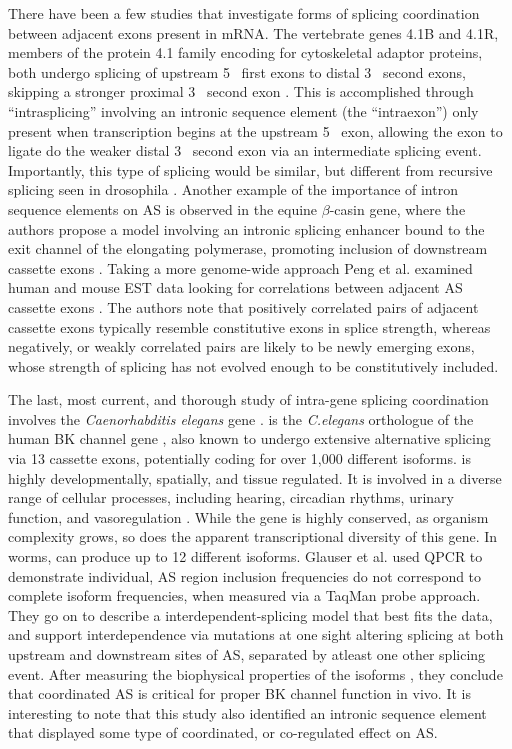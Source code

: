 There have been a few studies that investigate forms of splicing coordination between adjacent exons present in mRNA. The vertebrate genes 4.1B and 4.1R, members of the protein 4.1 family encoding for cytoskeletal adaptor proteins, both undergo splicing of upstream 5\textprime~ first exons to distal 3\textprime~ second exons, skipping a stronger proximal 3\textprime~ second exon \citep{Parra2008, Parra2012}. This is accomplished through ``intrasplicing'' involving an intronic sequence element (the ``intraexon'') only present when transcription begins at the upstream 5\textprime~ exon, allowing the exon to ligate do the weaker distal 3\textprime~ second exon via an intermediate splicing event. Importantly, this type of splicing would be similar, but different from recursive splicing seen in drosophila \citep{Burnette2005a}. Another example of the importance of intron sequence elements on AS is observed in the equine $\beta$-casin gene, where the authors propose a model involving an intronic splicing enhancer bound to the exit channel of the elongating polymerase, promoting inclusion of downstream cassette exons \citep{Lenasi2006}. Taking a more genome-wide approach Peng et al. examined human and mouse EST data looking for correlations between adjacent AS cassette exons \citep{Peng2008}. The authors note that positively correlated pairs of adjacent cassette exons typically resemble constitutive exons in splice strength, whereas negatively, or weakly correlated pairs are likely to be newly emerging exons, whose strength of splicing has not evolved enough to be constitutively included. 

The last, most current, and thorough study of intra-gene splicing coordination involves the \textit{Caenorhabditis elegans} gene \slo{} \citep{Glauser2011, Johnson2011}. \slo{} is the \textit{C.elegans} orthologue of the human BK channel gene \kcnma{}, also known to undergo extensive alternative splicing \citep{Nilsen2010} via 13 cassette exons, potentially coding for over 1,000 different isoforms. \kcnma{} is highly developmentally, spatially, and tissue regulated. It is involved in a diverse range of cellular processes, including hearing, circadian rhythms, urinary function, and vasoregulation \citep{Fodor2009a}. While the gene is highly conserved, as organism complexity grows, so does the apparent transcriptional diversity of this gene. In worms, \slo{} can produce up to 12 different isoforms. Glauser et al. used QPCR to demonstrate individual, AS region inclusion frequencies do not correspond to complete isoform frequencies, when measured via a TaqMan probe approach. They go on to describe a interdependent-splicing model that best fits the data, and support interdependence via mutations at one sight altering splicing at both upstream and downstream sites of AS, separated by atleast one other splicing event. After measuring the biophysical properties of the isoforms \citep{Johnson2011}, they conclude that coordinated AS is critical for proper BK channel function in vivo. It is interesting to note that this study also identified an intronic sequence element that displayed some type of coordinated, or co-regulated effect on AS. 

